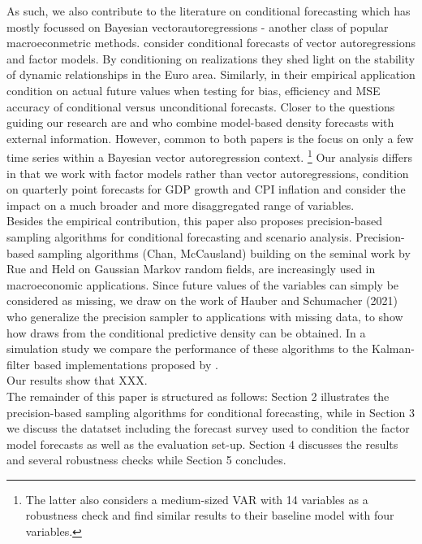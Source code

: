 \documentclass[notitlepage,a4paper,12pt]{article}
\begin{document}
As such, we also contribute to the literature on conditional forecasting which has mostly focussed on Bayesian vectorautoregressions - another class of popular macroeconmetric methods. \citet{bgl_2015ijf} consider conditional forecasts of vector autoregressions and factor models. By conditioning on realizations they shed light on the stability of dynamic relationships in the Euro area. Similarly, in their empirical application \citet{clarkmccracken_2017_jae} condition on actual future values when testing for bias, efficiency and MSE accuracy of conditional versus unconditional forecasts. Closer to the questions guiding our research are \citet{kruegerclarkravazzolo2017_jbes} and \citet{ganicsodendahl_2021_ijf} who combine model-based density forecasts with external information. However, common to both papers is the focus on only a few time series within a Bayesian vector autoregression context. \footnote{The latter also considers a medium-sized VAR with 14 variables as a robustness check and find similar results to their baseline model with four variables.} Our analysis differs in that we work with factor models rather than vector autoregressions, condition on quarterly point forecasts for GDP growth and CPI inflation and consider the impact on a much broader and more disaggregated range of variables.\\

Besides the empirical contribution, this paper also proposes precision-based sampling algorithms for conditional forecasting and
scenario analysis. Precision-based sampling algorithms (Chan, McCausland) building on the seminal work by Rue and Held on Gaussian Markov random fields, are increasingly used in macroeconomic applications. Since future values of the variables can simply be considered as missing, we draw on the work of Hauber and Schumacher (2021) who generalize the precision sampler to applications with missing data, to show how draws from the conditional predictive density can be obtained. In a simulation study we compare the performance of these algorithms to the Kalman-filter based implementations proposed by \citet{bgl_2015ijf}.\\

Our results show that XXX.\\

The remainder of this paper is structured as follows: Section 2 illustrates the precision-based sampling algorithms for conditional forecasting, while in Section 3 we discuss the datatset including the forecast survey used to condition the factor model forecasts as well as the evaluation set-up. Section 4 discusses the results and several robustness checks while Section 5 concludes.
\end{document}
